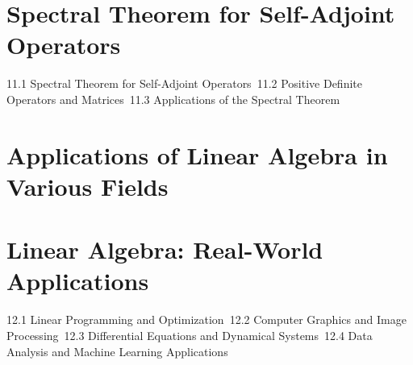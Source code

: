 \section{Spectral Theorem for Self-Adjoint Operators}
11.1 Spectral Theorem for Self-Adjoint Operators\
11.2 Positive Definite Operators and Matrices\
11.3 Applications of the Spectral Theorem\
\section{Applications of Linear Algebra in Various Fields}
\section{Linear Algebra: Real-World Applications}
12.1 Linear Programming and Optimization\
12.2 Computer Graphics and Image Processing\
12.3 Differential Equations and Dynamical Systems\
12.4 Data Analysis and Machine Learning Applications\
